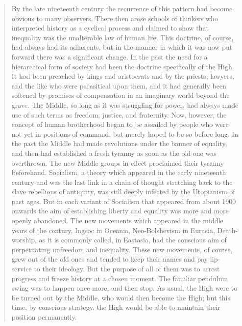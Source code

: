 \begin{quotation}
By the late nineteenth century the recurrence of this pattern had become
obvious to many observers. There then arose schools of thinkers who
interpreted history as a cyclical process and claimed to show that
inequality was the unalterable law of human life. This doctrine, of
course, had always had its adherents, but in the manner in which it was
now put forward there was a significant change. In the past the need for
a hierarchical form of society had been the doctrine specifically of the
High. It had been preached by kings and aristocrats and by the priests,
lawyers, and the like who were parasitical upon them, and it had
generally been softened by promises of compensation in an imaginary
world beyond the grave. The Middle, so long as it was struggling for
power, had always made use of such terms as freedom, justice, and
fraternity. Now, however, the concept of human brotherhood began to be
assailed by people who were not yet in positions of command, but merely
hoped to be so before long. In the past the Middle had made revolutions
under the banner of equality, and then had established a fresh tyranny
as soon as the old one was overthrown. The new Middle groups in effect
proclaimed their tyranny beforehand. Socialism, a theory which appeared
in the early nineteenth century and was the last link in a chain of
thought stretching back to the slave rebellions of antiquity, was still
deeply infected by the Utopianism of past ages. But in each variant of
Socialism that appeared from about 1900 onwards the aim of establishing
liberty and equality was more and more openly abandoned. The new
movements which appeared in the middle years of the century, Ingsoc in
Oceania, Neo-Bolshevism in Eurasia, Death-worship, as it is commonly
called, in Eastasia, had the conscious aim of perpetuating unfreedom and
inequality. These new movements, of course, grew out of the old ones and
tended to keep their names and pay lip-service to their ideology. But
the purpose of all of them was to arrest progress and freeze history at
a chosen moment. The familiar pendulum swing was to happen once more,
and then stop. As usual, the High were to be turned out by the Middle,
who would then become the High; but this time, by conscious strategy,
the High would be able to maintain their position permanently.


\end{quotation}
